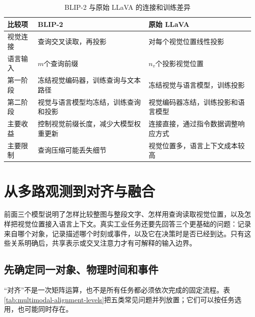 \begin{table}[htbp]
\centering
\caption{BLIP-2 与原始 LLaVA 的连接和训练差异}
\label{tab:multimodal-interaction}
\small
\setlength{\tabcolsep}{4pt}
\begin{tabular}{@{}>{\raggedright\arraybackslash}m{2.0cm}>{\raggedright\arraybackslash}m{5.1cm}>{\raggedright\arraybackslash}m{5.1cm}@{}}
\toprule
比较项 & BLIP-2 & 原始 LLaVA \\
\midrule
视觉连接 & 查询交叉读取，再投影 & 对每个视觉位置线性投影 \\
语言输入 & $m$个查询前缀 & $n_v$个投影视觉位置 \\
第一阶段 & 冻结视觉编码器，训练查询与文本路径 & 冻结视觉与语言模型，训练投影 \\
第二阶段 & 视觉与语言模型均冻结，训练查询和投影 & 视觉编码器冻结，训练投影和语言模型 \\
主要收益 & 控制视觉前缀长度，减少大模型权重更新 & 连接直接，通过指令数据调整响应方式 \\
主要限制 & 查询压缩可能丢失细节 & 视觉位置多，语言上下文成本较高 \\
\bottomrule
\end{tabular}
\end{table}

\section{从多路观测到对齐与融合}
前面三个模型说明了怎样比较整图与整段文字、怎样用查询读取视觉位置，以及怎样把视觉位置接入语言上下文。真实工业任务还要先回答三个更基础的问题：记录来自哪个对象，记录描述哪个时刻或事件，以及它在决策时是否已经到达。只有这些关系明确后，共享表示或交叉注意力才有可解释的输入边界。

\subsection{先确定同一对象、物理时间和事件}
“对齐”不是一次矩阵运算，也不是所有任务都必须依次完成的固定流程。表\ref{tab:multimodal-alignment-levels}把五类常见问题并列放置；它们可以按任务选用，也可能同时存在。

